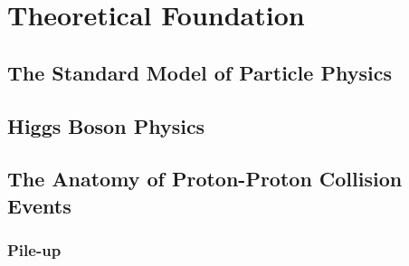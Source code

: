 \chapter{Theoretical Foundation}
\label{chap:theory}

\section{The Standard Model of Particle Physics}

\section{Higgs Boson Physics}


\section{The Anatomy of Proton-Proton Collision Events}
\label{sec:anatomy}


\subsection{Pile-up}

